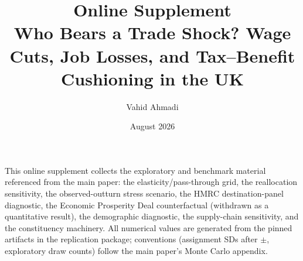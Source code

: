 \documentclass[11pt]{article}
\title{\bfseries Online Supplement\\[0.15cm] Who Bears a Trade Shock? Wage Cuts, Job Losses, and Tax--Benefit Cushioning in the UK\\[0.7cm]}
\author{Vahid Ahmadi}
\date{\small August 2026}
\begin{document}
\maketitle

\noindent This online supplement collects the exploratory and benchmark
material referenced from the main paper: the elasticity/pass-through grid,
the reallocation sensitivity, the observed-outturn stress scenario, the HMRC
destination-panel diagnostic, the Economic Prosperity Deal counterfactual
(withdrawn as a quantitative result), the demographic diagnostic, the
supply-chain sensitivity, and the constituency machinery. All numerical
values are generated from the pinned artifacts in the replication package;
conventions (assignment SDs after $\pm$, exploratory draw counts) follow the
main paper's Monte Carlo appendix.


\end{document}
